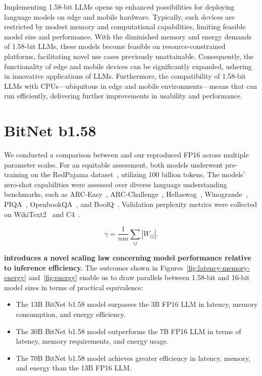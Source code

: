 Implementing 1.58-bit LLMs opens up enhanced possibilities for deploying language models on edge and mobile hardware. Typically, such devices are restricted by modest memory and computational capabilities, limiting feasible model size and performance. With the diminished memory and energy demands of 1.58-bit LLMs, these models become feasible on resource-constrained platforms, facilitating novel use cases previously unattainable. Consequently, the functionality of edge and mobile devices can be significantly expanded, ushering in innovative applications of LLMs. Furthermore, the compatibility of 1.58-bit LLMs with CPUs—ubiquitous in edge and mobile environments—means that  can run efficiently, delivering further improvements in usability and performance.

\section{BitNet b1.58}

We conducted a comparison between  and our reproduced FP16  across multiple parameter scales. For an equitable assessment, both models underwent pre-training on the RedPajama dataset~\cite{redpajama}, utilizing 100 billion tokens. The models' zero-shot capabilities were assessed over diverse language understanding benchmarks, such as ARC-Easy~\cite{arc}, ARC-Challenge~\cite{arc}, Hellaswag~\cite{hellaswag}, Winogrande~\cite{winoGrande}, PIQA~\cite{piqa}, OpenbookQA~\cite{openbookqa}, and BoolQ~\cite{boolq}. Validation perplexity metrics were collected on WikiText2~\cite{wikitext2} and C4~\cite{c4}.

\begin{equation}
    \gamma = \frac{1}{nm}\sum_{ij} |W_{ij}|.
\end{equation}

\textbf{ introduces a novel scaling law concerning model performance relative to inference efficiency.} The outcomes shown in Figures~\ref{fig:latency-memory-energy} and~\ref{fig:energy} enable us to draw parallels between 1.58-bit and 16-bit model sizes in terms of practical equivalence:

\begin{itemize}
    \item The 13B BitNet b1.58 model surpasses the 3B FP16 LLM in latency, memory consumption, and energy efficiency.
    \item The 30B BitNet b1.58 model outperforms the 7B FP16 LLM in terms of latency, memory requirements, and energy usage.
    \item The 70B BitNet b1.58 model achieves greater efficiency in latency, memory, and energy than the 13B FP16 LLM.
\end{itemize}

